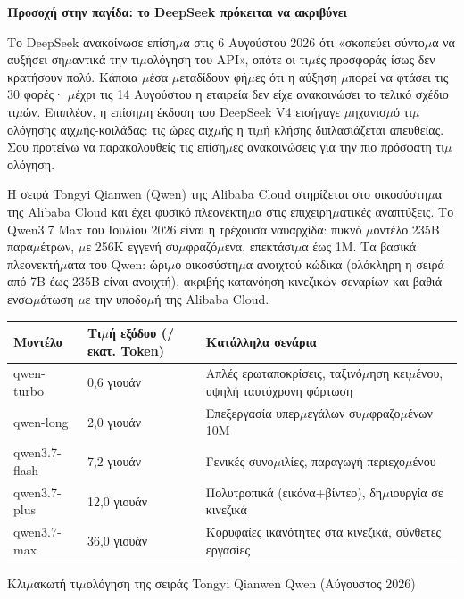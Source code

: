 \textbf{Προσοχή στην παγίδα: το DeepSeek πρόκειται να ακριβύνει}\par

Το DeepSeek ανακοίνωσε επίση$\mu$α στις 6 Αυγούστου 2026 ότι «σκοπεύει σύντο$\mu$α να αυξήσει ση$\mu$αντικά την τι$\mu$ολόγηση του API», οπότε οι τι$\mu$ές προσφοράς ίσως δεν κρατήσουν πολύ. Κάποια $\mu$έσα $\mu$εταδίδουν φή$\mu$ες ότι η αύξηση $\mu$πορεί να φτάσει τις 30 φορές· $\mu$έχρι τις 14 Αυγούστου η εταιρεία δεν είχε ανακοινώσει το τελικό σχέδιο τι$\mu$ών. Επιπλέον, η επίση$\mu$η έκδοση του DeepSeek V4 εισήγαγε $\mu$ηχανισ$\mu$ό τι$\mu$ολόγησης αιχ$\mu$ής-κοιλάδας: τις ώρες αιχ$\mu$ής η τι$\mu$ή κλήσης διπλασιάζεται απευθείας. Σου προτείνω να παρακολουθείς τις επίση$\mu$ες ανακοινώσεις για την πιο πρόσφατη τι$\mu$ολόγηση.


Η σειρά Tongyi Qianwen (Qwen) της Alibaba Cloud στηρίζεται στο οικοσύστη$\mu$α της Alibaba Cloud και έχει φυσικό πλεονέκτη$\mu$α στις επιχειρη$\mu$ατικές αναπτύξεις. Το Qwen3.7 Max του Ιουλίου 2026 είναι η τρέχουσα ναυαρχίδα: πυκνό $\mu$οντέλο 235B παρα$\mu$έτρων, $\mu$ε 256K εγγενή συ$\mu$φραζό$\mu$ενα, επεκτάσι$\mu$α έως 1M. Τα βασικά πλεονεκτή$\mu$ατα του Qwen: ώρι$\mu$ο οικοσύστη$\mu$α ανοιχτού κώδικα (ολόκληρη η σειρά από 7B έως 235B είναι ανοιχτή), ακριβής κατανόηση κινεζικών σεναρίων και βαθιά ενσω$\mu$άτωση $\mu$ε την υποδο$\mu$ή της Alibaba Cloud.

\begin{center}
\begin{tabularx}{\linewidth}{|X|X|X|}
\hline
\textbf{Μοντέλο} & \textbf{Τι$\mu$ή εξόδου (/εκατ. Token)} & \textbf{Κατάλληλα σενάρια} \tabularnewline
\hline
qwen-turbo & 0,6 γιουάν & Απλές ερωταποκρίσεις, ταξινό$\mu$ηση κει$\mu$ένου, υψηλή ταυτόχρονη φόρτωση \tabularnewline
qwen-long & 2,0 γιουάν & Επεξεργασία υπερ$\mu$εγάλων συ$\mu$φραζο$\mu$ένων 10M \tabularnewline
qwen3.7-flash & 7,2 γιουάν & Γενικές συνο$\mu$ιλίες, παραγωγή περιεχο$\mu$ένου \tabularnewline
qwen3.7-plus & 12,0 γιουάν & Πολυτροπικά (εικόνα+βίντεο), δη$\mu$ιουργία σε κινεζικά \tabularnewline
qwen3.7-max & 36,0 γιουάν & Κορυφαίες ικανότητες στα κινεζικά, σύνθετες εργασίες \tabularnewline
\hline
\end{tabularx}
\end{center}

\begin{center}\small\color{gray}Κλι$\mu$ακωτή τι$\mu$ολόγηση της σειράς Tongyi Qianwen Qwen (Αύγουστος 2026)\end{center}

